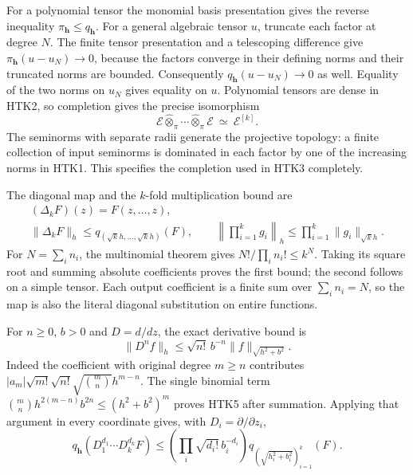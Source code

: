 For a polynomial tensor the monomial basis presentation gives
the reverse inequality $\pi_{\mathbf h}\le q_{\mathbf h}$.
For a general algebraic tensor $u$, truncate each factor at degree
$N$. The finite tensor presentation and a telescoping difference
give $\pi_{\mathbf h}(u-u_N)\to0$, because the factors converge
in their defining norms and their truncated norms are bounded.
Consequently $q_{\mathbf h}(u-u_N)\to0$ as well. Equality of the
two norms on $u_N$ gives equality on $u$. Polynomial tensors are
dense in HTK2, so completion gives the precise isomorphism
\begin{equation}\tag{HTK3}
 \mathcal E\widehat\otimes_\pi\cdots
       \widehat\otimes_\pi\mathcal E\ \simeq\ \mathcal E^{[k]}.
\end{equation}
The seminorms with separate radii generate the projective
topology: a finite collection of input seminorms is dominated
in each factor by one of the increasing norms in HTK1.
This specifies the completion used in HTK3 completely.

The diagonal map and the $k$-fold multiplication bound are
\begin{equation}\tag{HTK4}
\begin{gathered}
 (\Delta_kF)(z)=F(z,\ldots,z),\\
 \|\Delta_kF\|_h\le q_{(\sqrt{k}h,\ldots,\sqrt{k}h)}(F),
 \qquad
 \left\|\prod_{i=1}^kg_i\right\|_h
                       \le\prod_{i=1}^k\|g_i\|_{\sqrt{k}h}.
\end{gathered}
\end{equation}
For $N=\sum_i n_i$, the multinomial theorem gives
$N!/\prod_i n_i!\le k^N$. Taking its square root and
summing absolute coefficients proves the first bound; the
second follows on a simple tensor. Each output coefficient
is a finite sum over $\sum_i n_i=N$, so the map is also
the literal diagonal substitution on entire functions.

For $n\ge0$, $b>0$ and $D=d/dz$, the exact derivative bound is
\begin{equation}\tag{HTK5}
 \|D^nf\|_h\le\sqrt{n!}\,b^{-n}
                      \|f\|_{\sqrt{h^2+b^2}}.
\end{equation}
Indeed the coefficient with original degree $m\ge n$ contributes
$|a_m|\sqrt{m!}\sqrt{n!}\sqrt{\binom mn}h^{m-n}$.
The single binomial term
$\binom mn h^{2(m-n)}b^{2n}\le(h^2+b^2)^m$
proves HTK5 after summation. Applying that argument in every
coordinate gives, with $D_i=\partial/\partial z_i$,
\begin{equation}\tag{HTK6}
 q_{\mathbf h}(D_1^{d_1}\cdots D_k^{d_k}F)
 \le\left(\prod_i\sqrt{d_i!}\,b_i^{-d_i}\right)
        q_{(\sqrt{h_i^2+b_i^2})_{i=1}^k}(F).
\end{equation}

